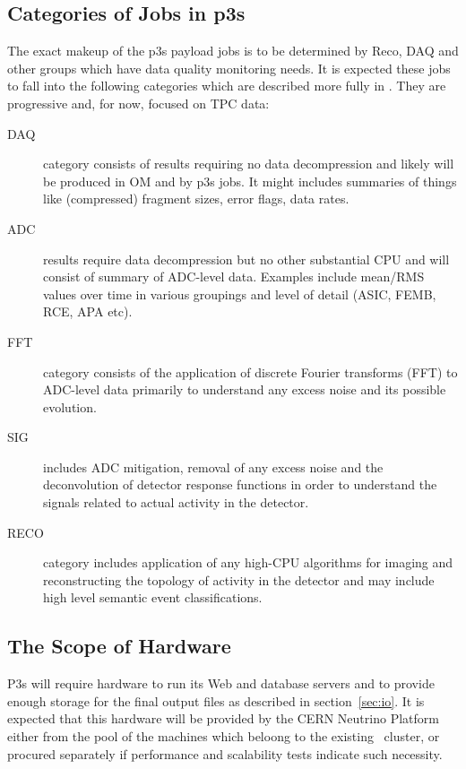 \documentclass[pdftex,12pt,letter]{article}
\begin{document}
\subsection{Categories of Jobs in p3s}
\label{sec:categories}

The exact makeup of the p3s payload jobs is to be determined by Reco,
DAQ and other groups which have data quality monitoring needs.  It is
expected these jobs to fall into the following categories which are
described more fully in \cite{docdb1811}.  They are progressive and,
for now, focused on TPC data:

\begin{description}

\item[DAQ] category consists of results requiring no data
  decompression and likely will be produced in OM and by p3s jobs.  It
  might includes summaries of things like (compressed) fragment sizes,
  error flags, data rates.

\item[ADC] results require data decompression but no other substantial
  CPU and will consist of summary of ADC-level data.  Examples include
  mean/RMS values over time in various groupings and level of detail
  (ASIC, FEMB, RCE, APA etc).

\item[FFT] category consists of the application of discrete Fourier
  transforms (FFT) to ADC-level data primarily to understand any
  excess noise and its possible evolution.

\item[SIG] includes ADC mitigation, removal of any excess noise and
  the deconvolution of detector response functions in order to
  understand the signals related to actual activity in the detector.

\item[RECO] category includes application of any high-CPU algorithms
  for imaging and reconstructing the topology of activity in the
  detector and may include high level semantic event classifications.

\end{description}

\subsection{The Scope of Hardware}
P3s will require hardware to run its Web and database servers
and to provide enough storage for the final output files as described in
section~\ref{sec:io}.  It is expected that this hardware will be provided
by the CERN Neutrino Platform either from the pool of the machines
which beloong to the existing~\cite{neut} cluster, or procured separately
if performance and scalability tests indicate such necessity.
\end{document}
